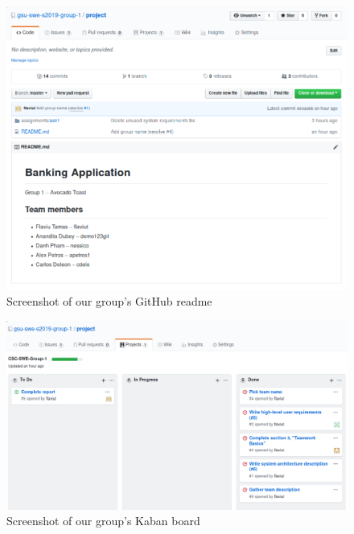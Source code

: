 \documentclass[
10pt, %
a4paper, %
oneside, %
headinclude,footinclude, %
BCOR5mm, %
]{scrartcl}
\begin{document}
\begin{figure}[H]
  \centering
    \includegraphics[width=\textwidth]{github_readme.png}
  \caption{Screenshot of our group's GitHub readme}
\end{figure}

\begin{figure}[H]
  \centering
    \includegraphics[width=\textwidth]{github_project.png}
  \caption{Screenshot of our group's Kaban board}
\end{figure}
\end{document}
